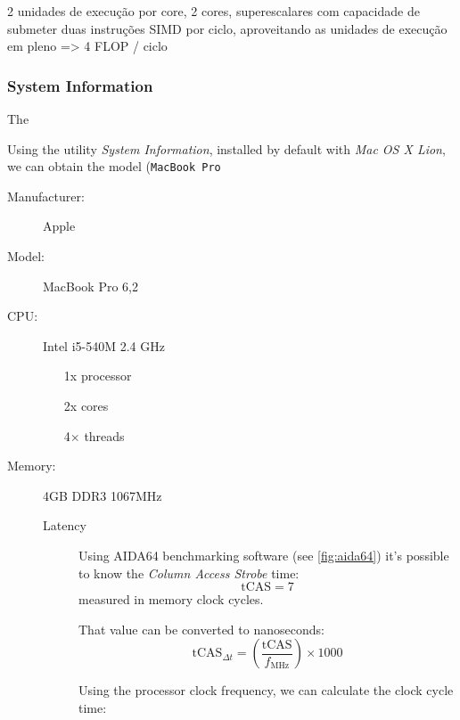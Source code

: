 \documentclass[a4paper,10pt]{report}
\begin{document}
2 unidades de execução por core, 2 cores, superescalares com capacidade de submeter duas instruções SIMD por ciclo, aproveitando as unidades de execução em pleno => 4 FLOP / ciclo

\subsubsection{System Information}
The 


Using the utility \textit{System Information}, installed by default with \textit{Mac OS X Lion}, we can obtain the model  (\texttt{MacBook Pro}

\begin{description}
\item[Manufacturer:]{Apple}
\item[Model:]{MacBook Pro 6,2}
\item[CPU:]{Intel i5-540M 2.4 GHz
	\begin{itemize}
	\item[1x]{processor}
	\item[2x]{cores}
	\item[4$\times$]{threads}
	\end{itemize}
}
\item[Memory:]{4GB DDR3 1067MHz
	\begin{description}
	\item[Latency]{
	Using AIDA64 benchmarking software (see \autoref{fig:aida64}) it's possible to know the \textit{Column Access Strobe} time:
		$$\mathrm{tCAS} = 7$$
	measured in memory clock cycles.
	
	That value can be converted to nanoseconds:
		$$\mathrm{tCAS}_{\Delta t} = \left( \frac{\mathrm{tCAS}}{f_{\mathrm{MHz}}} \right) \times 1000$$
	
	Using the processor clock frequency, we can calculate the clock cycle time:

	}
	\end{description}
}
\end{description}
\end{document}
